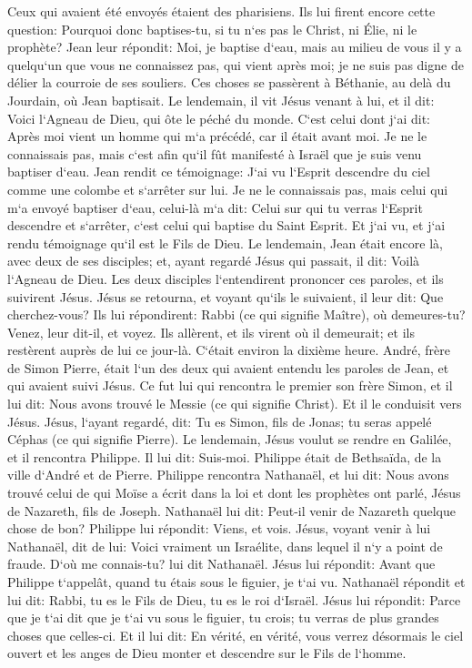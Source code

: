 \verse Ceux qui avaient été envoyés étaient des pharisiens. 
\verse Ils lui firent encore cette question: Pourquoi donc baptises-tu, si tu n`es pas le Christ, ni Élie, ni le prophète? 
\verse Jean leur répondit: Moi, je baptise d`eau, mais au milieu de vous il y a quelqu`un que vous ne connaissez pas, qui vient après moi; 
\verse je ne suis pas digne de délier la courroie de ses souliers. 
\verse Ces choses se passèrent à Béthanie, au delà du Jourdain, où Jean baptisait. 
\verse Le lendemain, il vit Jésus venant à lui, et il dit: Voici l`Agneau de Dieu, qui ôte le péché du monde. 
\verse C`est celui dont j`ai dit: Après moi vient un homme qui m`a précédé, car il était avant moi. 
\verse Je ne le connaissais pas, mais c`est afin qu`il fût manifesté à Israël que je suis venu baptiser d`eau. 
\verse Jean rendit ce témoignage: J`ai vu l`Esprit descendre du ciel comme une colombe et s`arrêter sur lui. 
\verse Je ne le connaissais pas, mais celui qui m`a envoyé baptiser d`eau, celui-là m`a dit: Celui sur qui tu verras l`Esprit descendre et s`arrêter, c`est celui qui baptise du Saint Esprit. 
\verse Et j`ai vu, et j`ai rendu témoignage qu`il est le Fils de Dieu. 
\verse Le lendemain, Jean était encore là, avec deux de ses disciples; 
\verse et, ayant regardé Jésus qui passait, il dit: Voilà l`Agneau de Dieu. 
\verse Les deux disciples l`entendirent prononcer ces paroles, et ils suivirent Jésus. 
\verse Jésus se retourna, et voyant qu`ils le suivaient, il leur dit: Que cherchez-vous? Ils lui répondirent: Rabbi (ce qui signifie Maître), où demeures-tu? 
\verse Venez, leur dit-il, et voyez. Ils allèrent, et ils virent où il demeurait; et ils restèrent auprès de lui ce jour-là. C`était environ la dixième heure. 
\verse André, frère de Simon Pierre, était l`un des deux qui avaient entendu les paroles de Jean, et qui avaient suivi Jésus. 
\verse Ce fut lui qui rencontra le premier son frère Simon, et il lui dit: Nous avons trouvé le Messie (ce qui signifie Christ). 
\verse Et il le conduisit vers Jésus. Jésus, l`ayant regardé, dit: Tu es Simon, fils de Jonas; tu seras appelé Céphas (ce qui signifie Pierre). 
\verse Le lendemain, Jésus voulut se rendre en Galilée, et il rencontra Philippe. Il lui dit: Suis-moi. 
\verse Philippe était de Bethsaïda, de la ville d`André et de Pierre. 
\verse Philippe rencontra Nathanaël, et lui dit: Nous avons trouvé celui de qui Moïse a écrit dans la loi et dont les prophètes ont parlé, Jésus de Nazareth, fils de Joseph. 
\verse Nathanaël lui dit: Peut-il venir de Nazareth quelque chose de bon? Philippe lui répondit: Viens, et vois. 
\verse Jésus, voyant venir à lui Nathanaël, dit de lui: Voici vraiment un Israélite, dans lequel il n`y a point de fraude. 
\verse D`où me connais-tu? lui dit Nathanaël. Jésus lui répondit: Avant que Philippe t`appelât, quand tu étais sous le figuier, je t`ai vu. 
\verse Nathanaël répondit et lui dit: Rabbi, tu es le Fils de Dieu, tu es le roi d`Israël. 
\verse Jésus lui répondit: Parce que je t`ai dit que je t`ai vu sous le figuier, tu crois; tu verras de plus grandes choses que celles-ci. 
\verse Et il lui dit: En vérité, en vérité, vous verrez désormais le ciel ouvert et les anges de Dieu monter et descendre sur le Fils de l`homme. 


